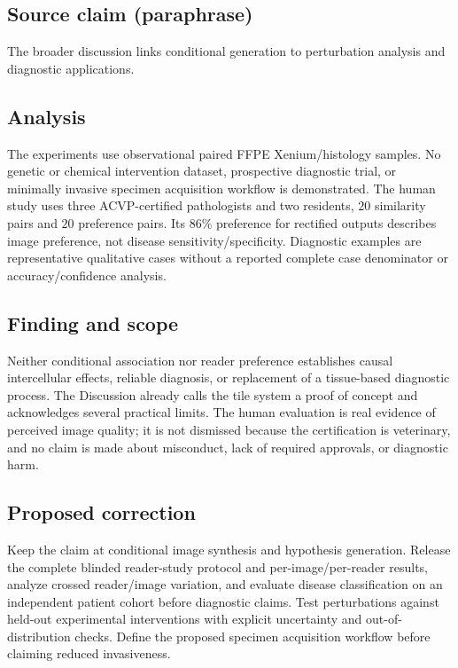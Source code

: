 \documentclass[11pt]{article}
\begin{document}
\subsection*{Source claim (paraphrase)}

The broader discussion links conditional generation to perturbation analysis and diagnostic applications.

\subsection*{Analysis}

The experiments use observational paired FFPE Xenium/histology samples. No genetic or chemical intervention dataset, prospective diagnostic trial, or minimally invasive specimen acquisition workflow is demonstrated. The human study uses three ACVP-certified pathologists and two residents, \(20\) similarity pairs and \(20\) preference pairs. Its \(86\%\) preference for rectified outputs describes image preference, not disease sensitivity/specificity. Diagnostic examples are representative qualitative cases without a reported complete case denominator or accuracy/confidence analysis.

\subsection*{Finding and scope}

Neither conditional association nor reader preference establishes causal intercellular effects, reliable diagnosis, or replacement of a tissue-based diagnostic process. The Discussion already calls the tile system a proof of concept and acknowledges several practical limits. The human evaluation is real evidence of perceived image quality; it is not dismissed because the certification is veterinary, and no claim is made about misconduct, lack of required approvals, or diagnostic harm.

\subsection*{Proposed correction}

Keep the claim at conditional image synthesis and hypothesis generation. Release the complete blinded reader-study protocol and per-image/per-reader results, analyze crossed reader/image variation, and evaluate disease classification on an independent patient cohort before diagnostic claims. Test perturbations against held-out experimental interventions with explicit uncertainty and out-of-distribution checks. Define the proposed specimen acquisition workflow before claiming reduced invasiveness.
\end{document}
